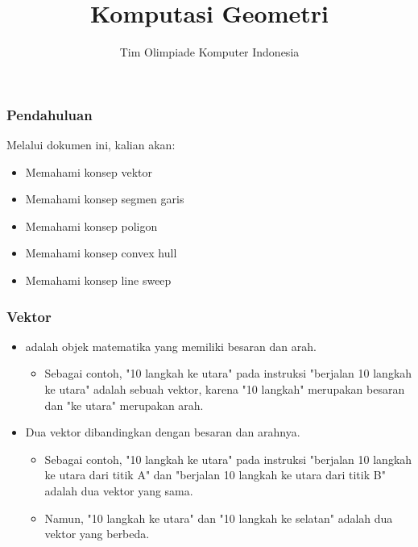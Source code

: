 

\title{Komputasi Geometri}
\author{Tim Olimpiade Komputer Indonesia}
\date{}



\begin{frame}
\titlepage
\end{frame}

\begin{frame}
\frametitle{Pendahuluan}
Melalui dokumen ini, kalian akan:
\begin{itemize}
  \item Memahami konsep vektor
  \item Memahami konsep segmen garis
  \item Memahami konsep poligon
  \item Memahami konsep convex hull
  \item Memahami konsep line sweep
\end{itemize}
\end{frame}

\begin{frame}
\frametitle{Vektor}
\begin{itemize}
  \item {} adalah objek matematika yang memiliki besaran dan arah.
  \begin{itemize}
    \item Sebagai contoh, "10 langkah ke utara" pada instruksi "berjalan 10 langkah ke utara" adalah sebuah vektor, karena "10 langkah" merupakan besaran dan "ke utara" merupakan arah. 
  \end{itemize}
  \item Dua vektor dibandingkan dengan besaran dan arahnya.
  \begin{itemize}
    \item Sebagai contoh, "10 langkah ke utara" pada instruksi "berjalan 10 langkah ke utara dari titik A" dan "berjalan 10 langkah ke utara dari titik B" adalah dua vektor yang sama.
    \item Namun, "10 langkah ke utara" dan "10 langkah ke selatan" adalah dua vektor yang berbeda.
  \end{itemize}
\end{itemize}
\end{frame}

